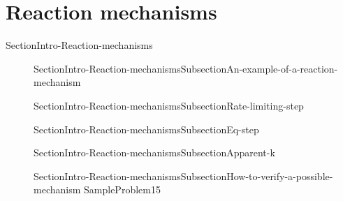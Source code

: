 \documentclass[main.tex]{subfiles}
\begin{document}
\section{Reaction mechanisms} {SectionIntro-Reaction-mechanisms}
\sloppy \begin{description}
\item[]  {SectionIntro-Reaction-mechanismsSubsectionAn-example-of-a-reaction-mechanism}
\item[] {SectionIntro-Reaction-mechanismsSubsectionRate-limiting-step}
\item[] {SectionIntro-Reaction-mechanismsSubsectionEq-step}
\item[] {SectionIntro-Reaction-mechanismsSubsectionApparent-k}

 \item[] {SectionIntro-Reaction-mechanismsSubsectionHow-to-verify-a-possible-mechanism}
  {SampleProblem15}
  \end{description}
\end{document}
